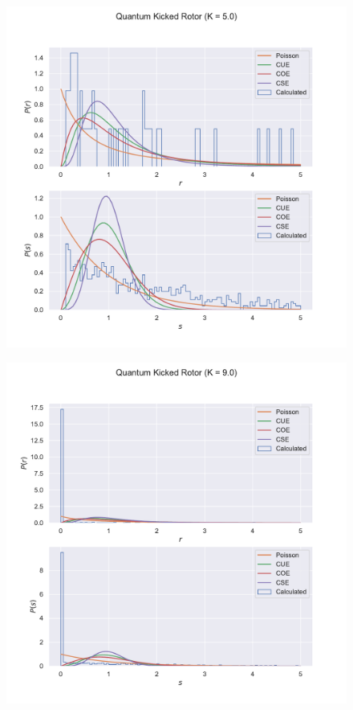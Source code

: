 \documentclass[12pt]{article}
\begin{document}
\begin{figure}
    \centering
    \includegraphics[width=\linewidth]{kickedrotor_spectrum_K5.0_suppressed.pdf}
\end{figure}
\begin{figure}
    \centering
    \includegraphics[width=\linewidth]{kickedrotor_spectrum_K9.0.pdf}
\end{figure}
\end{document}
